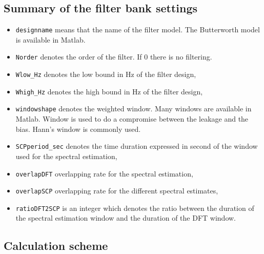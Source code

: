 \subsection{Summary of the filter bank settings}

\label{sss:filter-bank-settings}


{\small}


\begin{itemize}
\item
{\tt designname} means that the name of the filter model. The Butterworth model is available in Matlab. 
\item
{\tt Norder} denotes the order of the filter. If 0 there is no filtering. 
\item
{\tt Wlow\_Hz} denotes the low bound in Hz of the filter design,
\item
{\tt Whigh\_Hz} denotes the high bound in Hz of the filter design,
\item
{\tt windowshape} denotes the weighted window. Many windows are available in Matlab. Window is used to do a compromise between the leakage and the bias. Hann's window is commonly used.
\item
{\tt SCPperiod\_sec} denotes the time duration expressed in second of the window used for the spectral estimation,
\item
{\tt overlapDFT} overlapping rate for the spectral estimation,
\item
{\tt overlapSCP} overlapping rate for the different spectral estimates,
\item
{\tt ratioDFT2SCP} is an integer which denotes the ratio between the duration of the spectral estimation window and the duration of the DFT window. 

\end{itemize}

\newpage\clearpage

\subsection{Calculation scheme}

